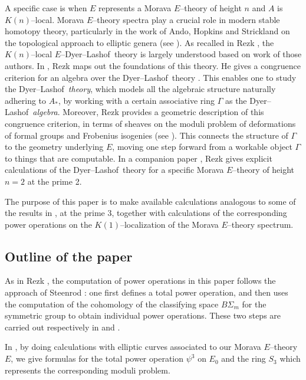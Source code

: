 \documentclass[microtype]{gtpart}     %
\theoremstyle{remark}
\theoremstyle{definition}
\newcommand{\DL}{Dyer--Lashof~}
\newcommand{\G}{\Gamma}
\newcommand{\p}{\psi^3}
\begin{document}
A specific case is when $E$ represents a Morava $E$--theory of height $n$ and 
$A$ is $K(n)$--local.  Morava $E$--theory spectra play a crucial role in 
modern stable homotopy theory, particularly in the work of Ando, Hopkins and 
Strickland on the topological approach to elliptic genera (see \cite{cube}).  
As recalled in Rezk \cite[1.5]{cong}, the $K(n)$--local $E$--\DL theory is 
largely understood based on work of those authors.  In \cite{cong}, Rezk maps 
out the foundations of this theory.  He gives a congruence criterion for an 
algebra over the \DL theory \cite[Theorem A]{cong}.  This enables one to 
study the \DL {\em theory}, which models all the algebraic structure 
naturally adhering to $A_*$, by working with a certain associative ring $\G$ 
as the \DL {\em algebra}.  Moreover, Rezk provides a geometric description of 
this congruence criterion, in terms of sheaves on the moduli problem of 
deformations of formal groups and Frobenius isogenies (see 
\cite[Theorem B]{cong}).  This connects the structure of $\G$ to the geometry 
underlying $E$, moving one step forward from a workable object $\G$ to things 
that are computable.  In a companion paper \cite{h2p2}, Rezk gives explicit 
calculations of the \DL theory for a specific Morava $E$--theory of height 
$n = 2$ at the prime 2.  

The purpose of this paper is to make available calculations analogous to some 
of the results in \cite{h2p2}, at the prime 3, together with calculations of 
the corresponding power operations on the $K(1)$--localization of the Morava 
$E$--theory spectrum.  


\subsection{Outline of the paper}

As in Rezk \cite{h2p2}, the computation of power operations in this paper 
follows the approach of Steenrod \cite{steenrod}: one first defines a total 
power operation, and then uses the computation of the cohomology of the 
classifying space $B\Sigma_m$ for the symmetric group to obtain individual 
power operations.  These two steps are carried out respectively in 
 and .  

In , by doing calculations with elliptic curves associated 
to our Morava $E$--theory $E$, we give formulas for the total power operation 
$\p$ on $E_0$ and the ring $S_3$ which represents the corresponding moduli 
problem.  
\end{document}
